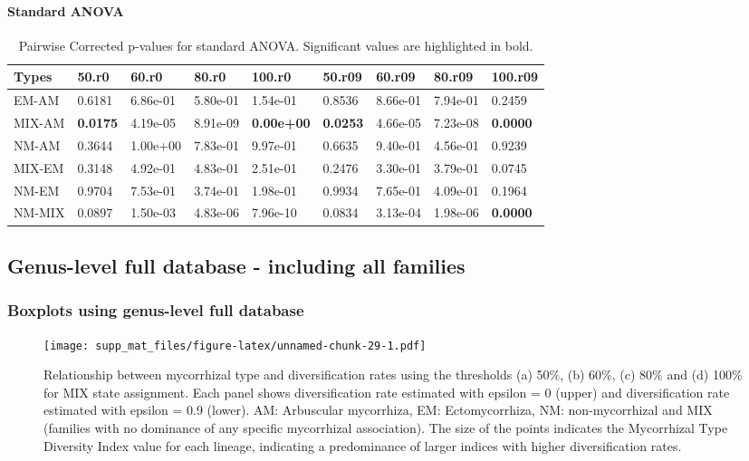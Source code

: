 \documentclass[]{article}
\let\oldparagraph\paragraph
\renewcommand{\paragraph}[1]{\oldparagraph{#1}\mbox{}}
\begin{document}
\hypertarget{standard-anova-5}{%
\paragraph{Standard ANOVA}\label{standard-anova-5}}

\begin{table}[H]

\caption{\label{tab:unnamed-chunk-27}Pairwise Corrected p-values for standard ANOVA. Significant values are highlighted in bold.}
\centering
\begin{tabular}{l|l|l|l|l|l|l|l|l}
\hline
Types & 50.r0 & 60.r0 & 80.r0 & 100.r0 & 50.r09 & 60.r09 & 80.r09 & 100.r09\\
\hline
EM-AM & 0.6181 & 6.86e-01 & 5.80e-01 & 1.54e-01 & 0.8536 & 8.66e-01 & 7.94e-01 & 0.2459\\
\hline
MIX-AM & \textbf{0.0175} & 4.19e-05 & 8.91e-09 & \textbf{0.00e+00} & \textbf{0.0253} & 4.66e-05 & 7.23e-08 & \textbf{0.0000}\\
\hline
NM-AM & 0.3644 & 1.00e+00 & 7.83e-01 & 9.97e-01 & 0.6635 & 9.40e-01 & 4.56e-01 & 0.9239\\
\hline
MIX-EM & 0.3148 & 4.92e-01 & 4.83e-01 & 2.51e-01 & 0.2476 & 3.30e-01 & 3.79e-01 & 0.0745\\
\hline
NM-EM & 0.9704 & 7.53e-01 & 3.74e-01 & 1.98e-01 & 0.9934 & 7.65e-01 & 4.09e-01 & 0.1964\\
\hline
NM-MIX & 0.0897 & 1.50e-03 & 4.83e-06 & 7.96e-10 & 0.0834 & 3.13e-04 & 1.98e-06 & \textbf{0.0000}\\
\hline
\end{tabular}
\end{table}

\hypertarget{genus-level-full-database---including-all-families}{%
\subsection{Genus-level full database - including all
families}\label{genus-level-full-database---including-all-families}}

\hypertarget{boxplots-using-genus-level-full-database}{%
\subsubsection{Boxplots using genus-level full
database}\label{boxplots-using-genus-level-full-database}}

\begin{figure}
\centering
\texttt{[image: supp\_mat\_files/figure-latex/unnamed-chunk-29-1.pdf]}
\caption{Relationship between mycorrhizal type and diversification rates
using the thresholds (a) 50\%, (b) 60\%, (c) 80\% and (d) 100\% for MIX
state assignment. Each panel shows diversification rate estimated with
epsilon = 0 (upper) and diversification rate estimated with epsilon =
0.9 (lower). AM: Arbuscular mycorrhiza, EM: Ectomycorrhiza, NM:
non-mycorrhizal and MIX (families with no dominance of any specific
mycorrhizal association). The size of the points indicates the
Mycorrhizal Type Diversity Index value for each lineage, indicating a
predominance of larger indices with higher diversification rates.}
\end{figure}
\end{document}
